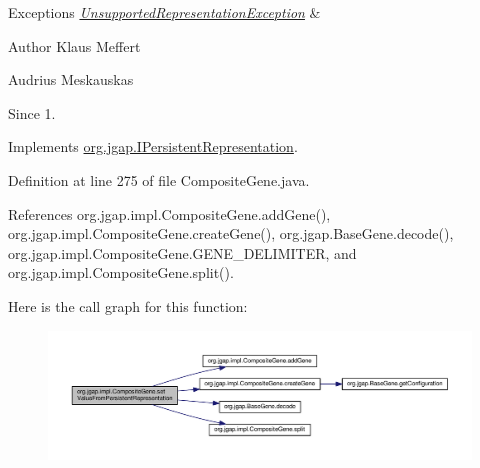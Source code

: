 \begin{DoxyExceptions}{Exceptions}
{\em \hyperlink{classorg_1_1jgap_1_1_unsupported_representation_exception}{Unsupported\-Representation\-Exception}} & \\
\hline
\end{DoxyExceptions}
\begin{DoxyAuthor}{Author}
Klaus Meffert 

Audrius Meskauskas 
\end{DoxyAuthor}
\begin{DoxySince}{Since}
1. 
\end{DoxySince}


Implements \hyperlink{interfaceorg_1_1jgap_1_1_i_persistent_representation_a94a345f1919c4840dd0b9eecf7afc6a3}{org.\-jgap.\-I\-Persistent\-Representation}.



Definition at line 275 of file Composite\-Gene.\-java.



References org.\-jgap.\-impl.\-Composite\-Gene.\-add\-Gene(), org.\-jgap.\-impl.\-Composite\-Gene.\-create\-Gene(), org.\-jgap.\-Base\-Gene.\-decode(), org.\-jgap.\-impl.\-Composite\-Gene.\-G\-E\-N\-E\-\_\-\-D\-E\-L\-I\-M\-I\-T\-E\-R, and org.\-jgap.\-impl.\-Composite\-Gene.\-split().



Here is the call graph for this function\-:
\nopagebreak
\begin{figure}[H]
\begin{center}
\leavevmode
\includegraphics[width=350pt]{classorg_1_1jgap_1_1impl_1_1_composite_gene_abd62d1ccb9e0753b93d11a89fd055d0e_cgraph}
\end{center}
\end{figure}


